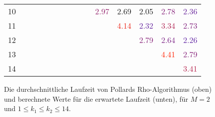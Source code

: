 \documentclass[a4paper, 11pt, ngerman]{article}
\theoremstyle{definition}
\theoremstyle{plain}
\theoremstyle{remark}
\begin{document}
\begin{figure}
\begin{tabular}{c|cccccccccccccc}
        10                   &                                  &                                  &                                  &                                  &                                  &                                  &                                  &                                  &                                  & \textcolor[HTML]{ 93206b }{2.97} & \textcolor[HTML]{ 7e2080 }{2.69} & \textcolor[HTML]{ 4e20b0 }{2.05} & \textcolor[HTML]{ 852079 }{2.78} & \textcolor[HTML]{ 652099 }{2.36} \\
        11                   &                                  &                                  &                                  &                                  &                                  &                                  &                                  &                                  &                                  &                                  & \textcolor[HTML]{ ea2014 }{4.14} & \textcolor[HTML]{ 62209c }{2.32} & \textcolor[HTML]{ af204f }{3.34} & \textcolor[HTML]{ 81207d }{2.73} \\
        12                   &                                  &                                  &                                  &                                  &                                  &                                  &                                  &                                  &                                  &                                  &                                  & \textcolor[HTML]{ 862078 }{2.79} & \textcolor[HTML]{ 7a2084 }{2.64} & \textcolor[HTML]{ 5d20a1 }{2.26} \\
        13                   &                                  &                                  &                                  &                                  &                                  &                                  &                                  &                                  &                                  &                                  &                                  &                                  & \textcolor[HTML]{ ff2000 }{4.41} & \textcolor[HTML]{ 852079 }{2.79} \\
        14                   &                                  &                                  &                                  &                                  &                                  &                                  &                                  &                                  &                                  &                                  &                                  &                                  &                                  & \textcolor[HTML]{ b4204a }{3.41} \\
    \end{tabular}

    \caption{Die durchschnittliche Laufzeit von Pollards Rho-Algorithmus (oben) und berechnete Werte für die erwartete Laufzeit (unten), für $M = 2$ und $1 \le k_1 \le k_2 \le 14$. }
    \label{fig:measurements-m2}
\end{figure}
\end{document}
